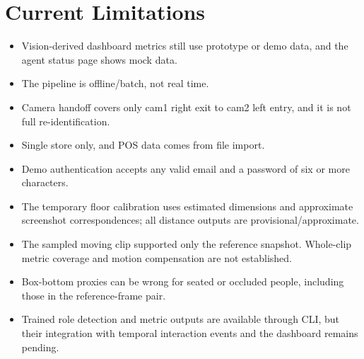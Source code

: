 \section{Current Limitations}
\begin{itemize}
\item Vision-derived dashboard metrics still use prototype or demo data, and the agent status page shows mock data.
\item The pipeline is offline/batch, not real time.
\item Camera handoff covers only cam1 right exit to cam2 left entry, and it is not full re-identification.
\item Single store only, and POS data comes from file import.
\item Demo authentication accepts any valid email and a password of six or more characters.
\item The temporary floor calibration uses estimated dimensions and approximate screenshot correspondences; all distance outputs are provisional/approximate.
\item The sampled moving clip supported only the reference snapshot. Whole-clip metric coverage and motion compensation are not established.
\item Box-bottom proxies can be wrong for seated or occluded people, including those in the reference-frame pair.
\item Trained role detection and metric outputs are available through CLI, but their integration with temporal interaction events and the dashboard remains pending.
\end{itemize}
